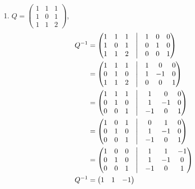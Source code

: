 \documentclass[13pt]{article}
\begin{document}
\begin{enumerate}[label=(\alph*),leftmargin=*]
\item $Q =
  \begin{pmatrix}
    1 & 1 & 1 \\
    1 & 0 & 1 \\
    1 & 1 & 2
  \end{pmatrix}
  $,
  \begin{align*}
    Q^{-1} &=
             \begin{pmatrix}
               1 & 1 & 1 & \bigm| & 1 & 0 & 0 \\
               1 & 0 & 1 & \bigm| & 0 & 1 & 0 \\
               1 & 1 & 2 & \bigm| & 0 & 0 & 1     
             \end{pmatrix} \\
           &=
             \begin{pmatrix}
               1 & 1 & 1 & \bigm| & 1 & 0 & 0 \\
               0 & 1 & 0 & \bigm| & 1 & -1 & 0 \\
               1 & 1 & 2 & \bigm| & 0 & 0 & 1     
             \end{pmatrix} \\
           &=
             \begin{pmatrix}
               1 & 1 & 1 & \bigm| & 1 & 0 & 0 \\
               0 & 1 & 0 & \bigm| & 1 & -1 & 0 \\
               0 & 0 & 1 & \bigm| & -1 & 0 & 1
             \end{pmatrix} \\
           &=
             \begin{pmatrix}
               1 & 0 & 1 & \bigm| & 0 & 1 & 0 \\
               0 & 1 & 0 & \bigm| & 1 & -1 & 0 \\
               0 & 0 & 1 & \bigm| & -1 & 0 & 1
             \end{pmatrix} \\
           &=
             \begin{pmatrix}
               1 & 0 & 0 & \bigm| & 1 & 1 & -1 \\
               0 & 1 & 0 & \bigm| & 1 & -1 & 0 \\
               0 & 0 & 1 & \bigm| & -1 & 0 & 1
             \end{pmatrix} \\
    Q^{-1} &=
             \begin{pmatrix}
               1 & 1 & -1 \\

\end{pmatrix}
\end{align*}
\end{enumerate}
\end{document}
